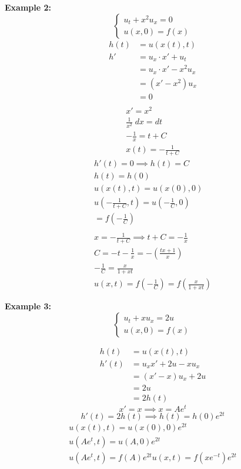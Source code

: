 \documentclass[10pt]{article}
\begin{document}
\textbf{Example 2:} 
\[\begin{cases}
    u_t + x^2 u_x = 0\\
    u(x, 0) = f(x)
\end{cases}\]
\begin{align*}
    h(t) &= u(x(t), t)\\
    h' &= u_x\cdot x' + u_t\\
    &=  u_x\cdot x' - x^2u_x\\
    &= (x' - x^2)u_x\\
    &= 0\\
\end{align*}
\begin{gather*}
    x' = x^2\\
    \frac{1}{x^2} \; dx = dt\\
    -\frac{1}{x} = t + C\\
    x(t) = -\frac{1}{t + C}
\end{gather*}
\begin{gather*}
    h'(t) = 0 \implies h(t) = C\\
    h(t) = h(0)\\
    u(x(t), t) = u(x(0), 0)\\
    u(-\frac{1}{t + C}, t) = u(-\frac{1}{C}, 0)\\ = f(-\frac{1}{C})\\
    \\
    x = - \frac{1}{t + C} \implies t + C = -\frac{1}{x}\\
    C = -t - \frac{1}{x} = -(\frac{tx + 1}{x})\\
    -\frac{1}{C} = \frac{x}{1 + xt}\\
    u(x, t) = f(-\frac{1}{C}) = f(\frac{x}{1 + xt})
\end{gather*}

\textbf{Example 3:}
\[\begin{cases}
    u_t + xu_x = 2u\\
    u(x, 0) = f(x)
\end{cases}\]

\begin{align*}
    h(t) &= u(x(t), t)\\
    h'(t) &= u_x x' + 2u - xu_x\\
    &= (x' - x)u_x + 2u\\
    &= 2u\\
    &= 2h(t)
\end{align*}
\[x' = x \implies x = Ae^t\]
\[h'(t) = 2h(t) \implies h(t) = h(0)e^{2t}\]
\begin{gather*}
    u(x(t), t) = u(x(0), 0)e^{2t}\\
    u(Ae^t, t) = u(A, 0)e^{2t}\\
    u(Ae^t, t) = f(A)e^{2t}
    u(x, t) = f(xe^{-t})e^{2t}
\end{gather*}
\end{document}
